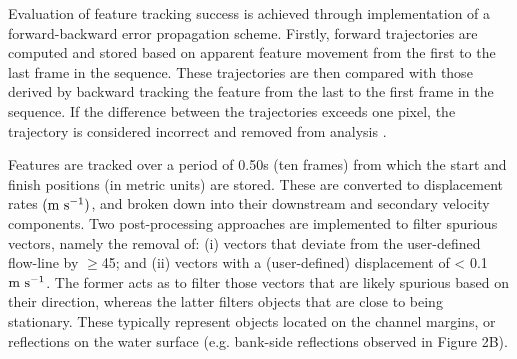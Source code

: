 \documentclass[hess, manuscript]{copernicus} %
\begin{document}
Evaluation of feature tracking success is achieved through implementation of a forward-backward error propagation scheme. Firstly, forward trajectories are computed and stored based on apparent feature movement from the first to the last frame in the sequence. These trajectories are then compared with those derived by backward tracking the feature from the last to the first frame in the sequence. If the difference between the trajectories exceeds one pixel, the trajectory is considered incorrect and removed from analysis \citep{Kalal2010}.

Features are tracked over a period of 0.50s (ten frames) from which the start and finish positions (in metric units) are stored. These are converted to displacement rates $(\textnormal{m s\textsuperscript{-1}})$, and broken down into their downstream and secondary velocity components. Two post-processing approaches are implemented to filter spurious vectors, namely the removal of: (i) vectors that deviate from the user-defined flow-line by $\geq$45\degree; and (ii) vectors with a (user-defined) displacement of < 0.1$\textnormal{m s\textsuperscript{-1}}$. The former acts as to filter those vectors that are likely spurious based on their direction, whereas the latter filters objects that are close to being stationary. These typically represent objects located on the channel margins, or reflections on the water surface (e.g. bank-side reflections observed in Figure 2B).

\end{document}
